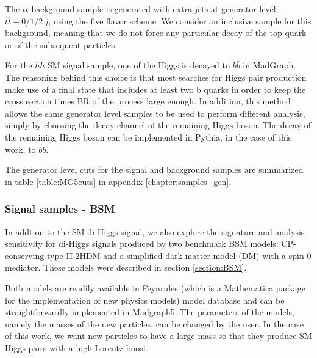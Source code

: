 
The $t\overline{t}$ background sample is generated with extra jets at generator level, $t\overline{t}+0/1/2 ~j$, using the five flavor scheme. We consider an inclusive sample for this background, meaning that we do not force any particular decay of the top quark or of the subsequent particles.
 
For the $hh$ SM signal sample, one of the Higgs is decayed to $b\overline{b}$ in MadGraph. The reasoning behind this choice is that most searches for Higgs pair production make use of a final state that includes at least two b quarks in order to keep the cross section times BR of the process large enough. In addition, this method allows the same generator level samples to be used to perform different analysis, simply by choosing the decay channel of the remaining Higgs boson. The decay of the remaining Higgs boson can be implemented in Pythia, in the case of this work, to $b\overline{b}$.

The generator level cuts for the signal and background samples are summarized in table \ref{table:MG5cuts} in appendix \ref{chapter:samples_gen}. 

\subsubsection{Signal samples - BSM} 

In addtion to the SM di-Higgs signal, we also explore the signature and analysis sensitivity for di-Higgs signals produced by two benchmark BSM models: CP-conserving type II 2HDM and a simplified dark matter model (DM) with a spin 0 mediator. These models were described in section \ref{section:BSM}.

Both models are readily available in Feynrules \cite{Feynrules} (which is a Mathematica package for the implementation of new physics models) model database and can be straightforwardly implemented in Madgraph5. The parameters of the models, namely the masses of the new particles, can be changed by the user. In the case of this work, we want new particles to have a large mass so that they produce SM Higgs pairs with a high Lorentz boost. 

